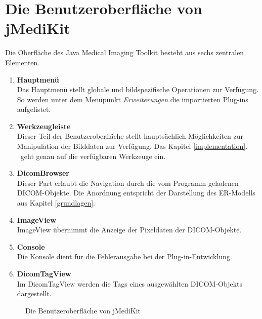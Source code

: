 \section{Die Benutzeroberfläche von jMediKit} \label{jmedikit_structure}

Die Oberfläche des Java Medical Imaging Toolkit besteht aus sechs zentralen Elementen.
\begin{enumerate}
\item \textbf{Hauptmenü} \\
	  Das Hauptmenü stellt globale und bildspezifische Operationen zur Verfügung. So werden unter dem Menüpunkt \textit{Erweiterungen} die importierten Plug-ins aufgelistet.
\item \textbf{Werkzeugleiste} \\
	  Dieser Teil der Benutzeroberfläche stellt hauptsächlich Möglichkeiten zur Manipulation der Bilddaten zur Verfügung. Das Kapitel \glqq \ref{implementation}. \grqq\ geht genau auf die verfügbaren Werkzeuge ein.
\item \textbf{DicomBrowser} \\
	  Dieser Part erlaubt die Navigation durch die vom Programm geladenen DICOM-Objekte. Die Anordnung entspricht der Darstellung des ER-Modells aus Kapitel \glqq \ref{grundlagen}. \grqq\
\item \textbf{ImageView} \\
	 ImageView übernimmt die Anzeige der Pixeldaten der DICOM-Objekte.
\item \textbf{Console} \\
	Die Konsole dient für die Fehlerausgabe bei der Plug-in-Entwicklung.
\item \textbf{DicomTagView} \\
	Im DicomTagView werden die Tags eines ausgewählten DICOM-Objekts dargestellt.
\end{enumerate}

\begin{figure}[htbp]
  \vspace{0.5cm}
  \centering
  \caption{Die Benutzeroberfläche von jMediKit}
  \label{jmedikitui}
  \vspace{0.5cm}
\end{figure}

